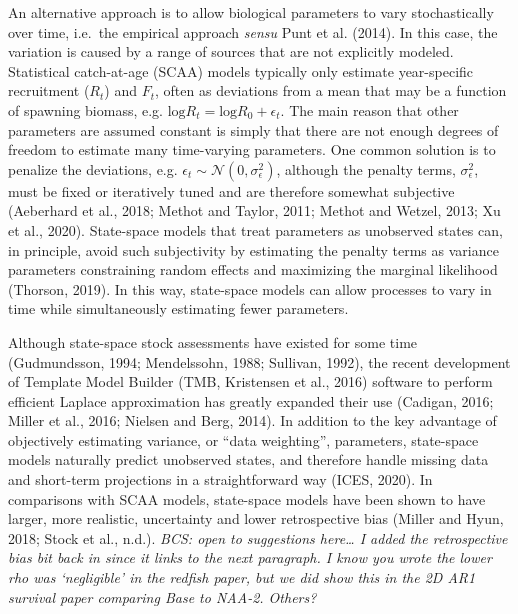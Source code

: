 \documentclass[]{article}
\begin{document}
An alternative approach is to allow biological parameters to vary
stochastically over time, i.e.~the empirical approach \emph{sensu} Punt
et al. (2014). In this case, the variation is caused by a range of
sources that are not explicitly modeled. Statistical catch-at-age (SCAA)
models typically only estimate year-specific recruitment (\(R_t\)) and
\(F_t\), often as deviations from a mean that may be a function of
spawning biomass, e.g. \(\text{log}R_t = \text{log}R_0 + \epsilon_t\).
The main reason that other parameters are assumed constant is simply
that there are not enough degrees of freedom to estimate many
time-varying parameters. One common solution is to penalize the
deviations, e.g. \(\epsilon_t \sim \mathcal{N}(0,\sigma^2_\epsilon)\),
although the penalty terms, \(\sigma^2_\epsilon\), must be fixed or
iteratively tuned and are therefore somewhat subjective (Aeberhard et
al., 2018; Methot and Taylor, 2011; Methot and Wetzel, 2013; Xu et al.,
2020). State-space models that treat parameters as unobserved states
can, in principle, avoid such subjectivity by estimating the penalty
terms as variance parameters constraining random effects and maximizing
the marginal likelihood (Thorson, 2019). In this way, state-space models
can allow processes to vary in time while simultaneously estimating
fewer parameters.

Although state-space stock assessments have existed for some time
(Gudmundsson, 1994; Mendelssohn, 1988; Sullivan, 1992), the recent
development of Template Model Builder (TMB, Kristensen et al., 2016)
software to perform efficient Laplace approximation has greatly expanded
their use (Cadigan, 2016; Miller et al., 2016; Nielsen and Berg, 2014).
In addition to the key advantage of objectively estimating variance, or
``data weighting'', parameters, state-space models naturally predict
unobserved states, and therefore handle missing data and short-term
projections in a straightforward way (ICES, 2020). In comparisons with
SCAA models, state-space models have been shown to have larger, more
realistic, uncertainty and lower retrospective bias (Miller and Hyun,
2018; Stock et al., n.d.). \emph{BCS: open to suggestions here\ldots{} I
added the retrospective bias bit back in since it links to the next
paragraph. I know you wrote the lower rho was `negligible' in the
redfish paper, but we did show this in the 2D AR1 survival paper
comparing Base to NAA-2. Others?}
\end{document}
